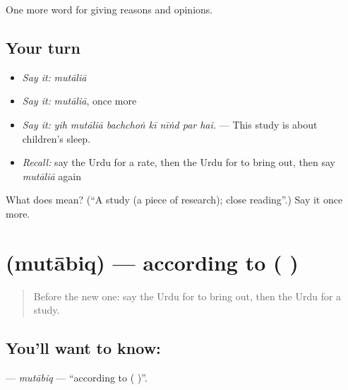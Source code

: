 \begin{grammarlens}[title={What you've built}]
One more word for giving reasons and opinions.
\end{grammarlens}

\subsection*{Your turn}
\begin{itemize}
\raggedright
  \item \emph{Say it:} \emph{mutāliā}
  \item \emph{Say it:} \emph{mutāliā}, once more
  \item \emph{Say it:} \emph{yih mutāliā bachchoṅ kī nīṅd par hai.} — This study is about children's sleep.
  \item \emph{Recall:} say the Urdu for a rate, then the Urdu for to bring out, then say \emph{mutāliā} again
\end{itemize}

\begin{tcolorbox}[breakable,colback=teal!4,colframe=teal!35!black,title={Before you move on}]
What does  mean? (\textquotedblleft{}A study (a piece of research); close reading\textquotedblright{}.) Say it once more.
\end{tcolorbox}
\section[\texorpdfstring{\ur{مطابق} (mutābiq)}{مطابق (mutābiq)}]{ (mutābiq) — according to ( )}

\label{lesson:UR-C351-mutabiq}



\begin{quote}
Before the new one: say the Urdu for to bring out, then the Urdu for a study.
\end{quote}

\subsection*{You'll want to know: }
\textbf{} — \emph{mutābiq} — \textquotedblleft{}according to ( )\textquotedblright{}.

\begin{quote}
        
\end{quote}

